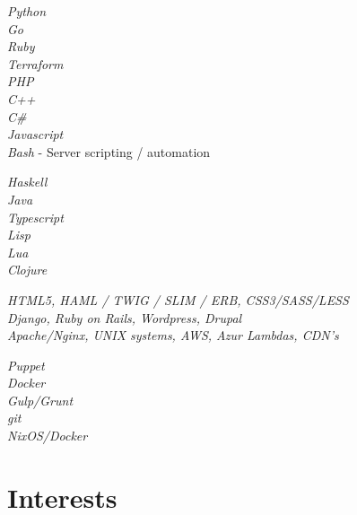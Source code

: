 \documentclass[10pt]{article} %
\begin{document}
{
\textit{Python}\\
\textit{Go}\\
\textit{Ruby}\\
\textit{Terraform}\\
\textit{PHP}\\
\textit{C++}\\
\textit{C\#}\\
\textit{Javascript}\\
\textit{Bash} - Server scripting / automation
}

{
  \textit{Haskell}\\
  \textit{Java}\\
  \textit{Typescript}\\
  \textit{Lisp}\\
  \textit{Lua} \\
  \textit{Clojure}\\
}


{
\textit{HTML5, HAML / TWIG / SLIM / ERB, CSS3/SASS/LESS}\\
\textit{Django, Ruby on Rails, Wordpress, Drupal}\\
\textit{Apache/Nginx, UNIX systems, AWS, Azur Lambdas, CDN's}\\
}


{
\textit{Puppet}\\
\textit{Docker}\\
\textit{Gulp/Grunt}\\
\textit{git}\\
\textit{NixOS/Docker}\\
}


\section{Interests}

\end{document}
